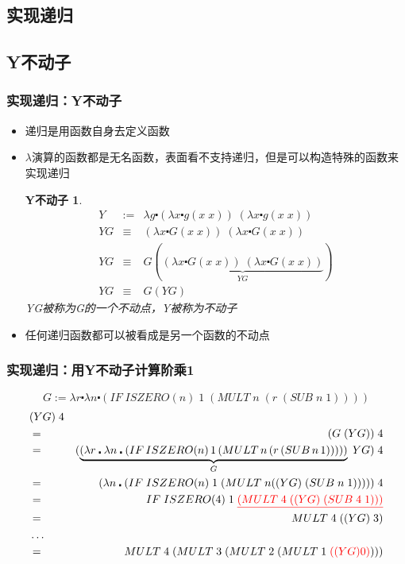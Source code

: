 \documentclass[CJKutf8,compress,hyperref]{beamer}
\begin{document}
\begin{CJK}{UTF8}{song}
\section{实现递归} 
\subsection{Y不动子}
\begin{frame}
  \frametitle{实现递归：Y不动子} 
  \begin{itemize}
  \item 递归是用函数自身去定义函数 
  \item $\lambda$演算的函数都是无名函数，表面看不支持递归，但是可以构造特殊的函数来实现递归
    \newtheorem{YComb}{Y不动子} 
    \begin{YComb}
      \begin{eqnarray*}
        Y & := & \lambda g \centerdot (\lambda x \centerdot g(x \;x)) \; (\lambda x \centerdot g(x \;x)) \\ 
        YG & \equiv & (\lambda x \centerdot G(x \;x)) \;  (\lambda x \centerdot G(x \;x)) \\ 
        YG & \equiv & G (\underbrace{(\lambda x \centerdot G(x \;x)) \;  (\lambda x \centerdot G(x \;x))}_{YG}) \\ 
        YG & \equiv & G(YG) 
      \end{eqnarray*} 
      YG被称为G的一个不动点，Y被称为不动子
    \end{YComb}
  \item  {\color{red}任何递归函数都可以被看成是另一个函数的不动点}
  \end{itemize}
\end{frame}

\begin{frame}
  \frametitle{实现递归：用Y不动子计算阶乘1} 
  \begin{displaymath}
    G  := \lambda r \centerdot \lambda n \centerdot (IF \; ISZERO(n) \; 1 \; (MULT \; n \; (r \; (SUB \; n \;1)))) 
  \end{displaymath}
  \begin{eqnarray*}
    & (YG) \; 4  & \\
    & =  &  (G \; (YG)) \; 4 \\  
    & =  & (\underbrace{(\lambda r \centerdot \lambda n \centerdot  (IF \, ISZERO(n) \, 1 \, (MULT \, n \, (r \, (SUB \, n \,1)))))}_G \; YG) \; 4 \\
    & =  & (\lambda n \centerdot (IF \; ISZERO(n) \; 1 \; (MULT \; n ((YG) \; (SUB \; n \; 1))))) \;4 \\
    & =  & IF \; ISZERO(4) \; 1 \; {\color{red}\underline{(MULT \; 4 \; ((YG) \; (SUB \;4 \;1)))}} \\
    & =  & MULT \; 4 \; ((YG) \;3)  \\ 
    & \dots & \\ 
    & = & MULT \; 4 \; (MULT \; 3 \; (MULT \; 2 \; (MULT \; 1 \; {\color{red}((YG) 0)})))   
  \end{eqnarray*}
\end{frame}


\end{CJK}
\end{document}
